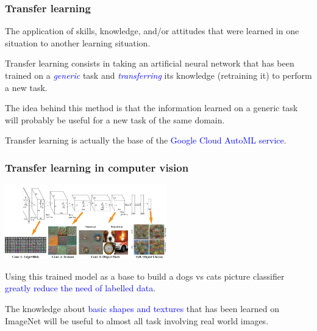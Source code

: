 \documentclass[10pt]{beamer}
\begin{document}
\begin{frame}

  \frametitle{Transfer learning}

  \begin{displayquote}[Perkins, 1992]
  The application of skills, knowledge, and/or attitudes that were
  learned in one situation to another learning situation.
  \end{displayquote}

  \bigskip

  Transfer learning consists in taking an artificial neural network
  that has been trained on a \textcolor{blue}{\emph{generic}} task and
  \textcolor{blue}{\emph{transferring}} its knowledge (retraining it)
  to perform a new task.

  \bigskip

  The idea behind this method is that the information learned on a
  generic task will probably be useful for a new task of the same
  domain.

  \bigskip

  Transfer learning is actually the base of the
  \textcolor{blue}{Google Cloud AutoML service}.

\end{frame}

\begin{frame}

  \frametitle{Transfer learning in computer vision}

  \begin{center}
    \includegraphics[width = 7cm]{images/alexnet_architecture.png}
  \end{center}

  Using this trained model as a base to build a dogs vs cats picture
  classifier \textcolor{blue}{greatly reduce the need of labelled
    data}.

  \bigskip

  The knowledge about \textcolor{blue}{basic shapes and textures} that
  has been learned on ImageNet will be useful to almost all task
  involving real world images.

\end{frame}
\end{document}

